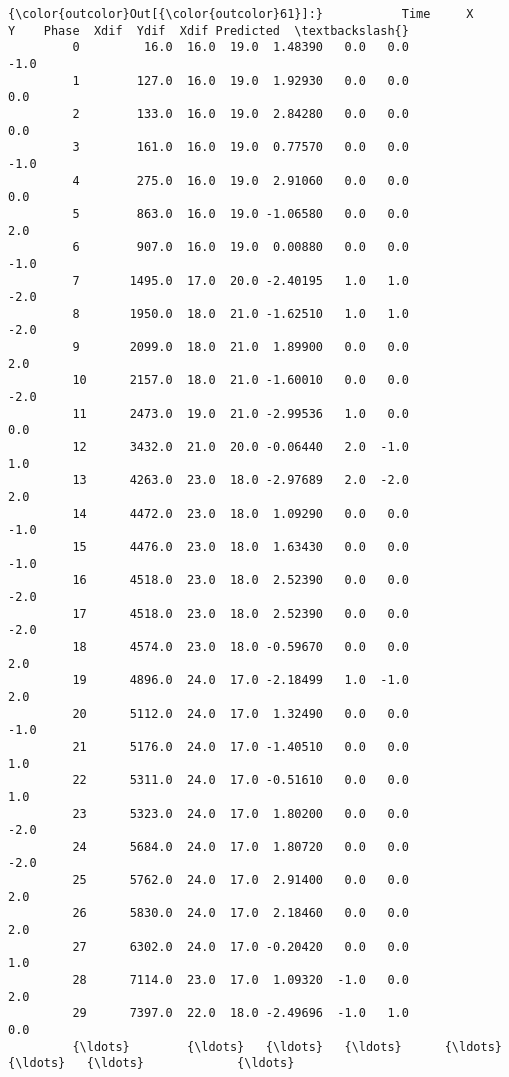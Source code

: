\documentclass[11pt]{article}
\begin{document}
\begin{Verbatim}[commandchars=\\\{\}]
{\color{outcolor}Out[{\color{outcolor}61}]:}           Time     X     Y    Phase  Xdif  Ydif  Xdif Predicted  \textbackslash{}
         0         16.0  16.0  19.0  1.48390   0.0   0.0            -1.0   
         1        127.0  16.0  19.0  1.92930   0.0   0.0             0.0   
         2        133.0  16.0  19.0  2.84280   0.0   0.0             0.0   
         3        161.0  16.0  19.0  0.77570   0.0   0.0            -1.0   
         4        275.0  16.0  19.0  2.91060   0.0   0.0             0.0   
         5        863.0  16.0  19.0 -1.06580   0.0   0.0             2.0   
         6        907.0  16.0  19.0  0.00880   0.0   0.0            -1.0   
         7       1495.0  17.0  20.0 -2.40195   1.0   1.0            -2.0   
         8       1950.0  18.0  21.0 -1.62510   1.0   1.0            -2.0   
         9       2099.0  18.0  21.0  1.89900   0.0   0.0             2.0   
         10      2157.0  18.0  21.0 -1.60010   0.0   0.0            -2.0   
         11      2473.0  19.0  21.0 -2.99536   1.0   0.0             0.0   
         12      3432.0  21.0  20.0 -0.06440   2.0  -1.0             1.0   
         13      4263.0  23.0  18.0 -2.97689   2.0  -2.0             2.0   
         14      4472.0  23.0  18.0  1.09290   0.0   0.0            -1.0   
         15      4476.0  23.0  18.0  1.63430   0.0   0.0            -1.0   
         16      4518.0  23.0  18.0  2.52390   0.0   0.0            -2.0   
         17      4518.0  23.0  18.0  2.52390   0.0   0.0            -2.0   
         18      4574.0  23.0  18.0 -0.59670   0.0   0.0             2.0   
         19      4896.0  24.0  17.0 -2.18499   1.0  -1.0             2.0   
         20      5112.0  24.0  17.0  1.32490   0.0   0.0            -1.0   
         21      5176.0  24.0  17.0 -1.40510   0.0   0.0             1.0   
         22      5311.0  24.0  17.0 -0.51610   0.0   0.0             1.0   
         23      5323.0  24.0  17.0  1.80200   0.0   0.0            -2.0   
         24      5684.0  24.0  17.0  1.80720   0.0   0.0            -2.0   
         25      5762.0  24.0  17.0  2.91400   0.0   0.0             2.0   
         26      5830.0  24.0  17.0  2.18460   0.0   0.0             2.0   
         27      6302.0  24.0  17.0 -0.20420   0.0   0.0             1.0   
         28      7114.0  23.0  17.0  1.09320  -1.0   0.0             2.0   
         29      7397.0  22.0  18.0 -2.49696  -1.0   1.0             0.0   
         {\ldots}        {\ldots}   {\ldots}   {\ldots}      {\ldots}   {\ldots}   {\ldots}             {\ldots}   

\end{Verbatim}
\end{document}
